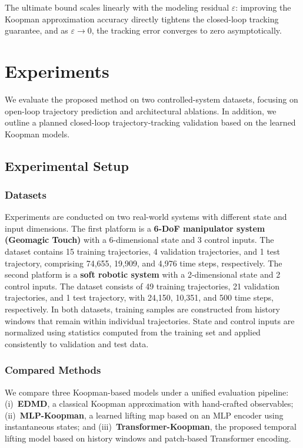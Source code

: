 \documentclass[journal]{IEEEtran}
\begin{document}
The ultimate bound scales linearly with the modeling residual $\varepsilon$: improving the Koopman approximation accuracy directly tightens the closed-loop tracking guarantee, and as $\varepsilon \to 0$, the tracking error converges to zero asymptotically.

\section{Experiments}
\label{sec:experiments}

We evaluate the proposed method on two controlled-system datasets, focusing on open-loop trajectory prediction and architectural ablations. In addition, we outline a planned closed-loop trajectory-tracking validation based on the learned Koopman models.

\subsection{Experimental Setup}

\subsubsection{Datasets}

Experiments are conducted on two real-world systems with different state and input dimensions. The first platform is a \textbf{6-DoF manipulator system (Geomagic Touch)} with a 6-dimensional state and 3 control inputs. The dataset contains 15 training trajectories, 4 validation trajectories, and 1 test trajectory, comprising 74,655, 19,909, and 4,976 time steps, respectively. The second platform is a \textbf{soft robotic system} with a 2-dimensional state and 2 control inputs. The dataset consists of 49 training trajectories, 21 validation trajectories, and 1 test trajectory, with 24,150, 10,351, and 500 time steps, respectively. In both datasets, training samples are constructed from history windows that remain within individual trajectories. State and control inputs are normalized using statistics computed from the training set and applied consistently to validation and test data.

\subsubsection{Compared Methods}

We compare three Koopman-based models under a unified evaluation pipeline: (i)~\textbf{EDMD}, a classical Koopman approximation with hand-crafted observables; (ii)~\textbf{MLP-Koopman}, a learned lifting map based on an MLP encoder using instantaneous states; and (iii)~\textbf{Transformer-Koopman}, the proposed temporal lifting model based on history windows and patch-based Transformer encoding.
\end{document}
